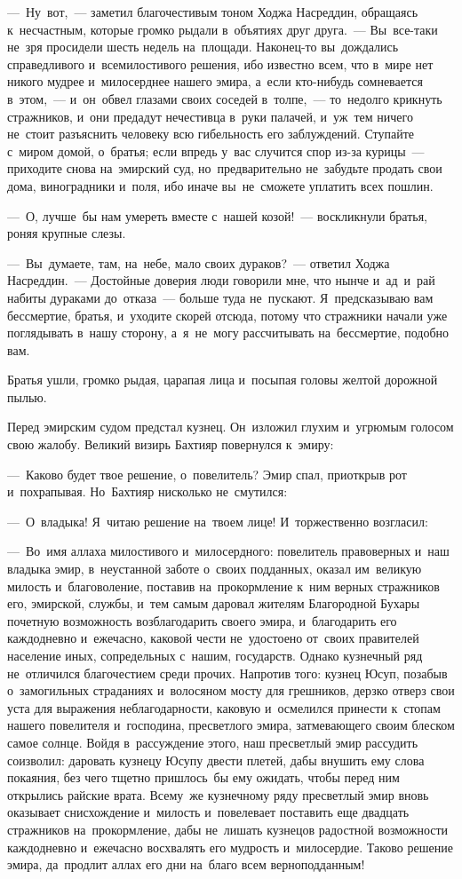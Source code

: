 \documentclass[12pt,a4paper]{book}
\begin{document}
—~Ну~вот,~— заметил благочестивым тоном Ходжа Насреддин, обращаясь к~несчастным, которые громко рыдали в~объятиях друг друга.~— Вы~все-таки не~зря просидели шесть недель на~площади. Наконец-то вы~дождались справедливого и~всемилостивого решения, ибо известно всем, что в~мире нет никого мудрее и~милосерднее нашего эмира, а~если кто-нибудь сомневается в~этом,~— и~он~обвел глазами своих соседей в~толпе,~— то~недолго крикнуть стражников, и~они предадут нечестивца в~руки палачей, и~уж~тем ничего не~стоит разъяснить человеку всю гибельность его заблуждений. Ступайте с~миром домой, о~братья; если впредь у~вас случится спор из-за курицы~— приходите снова на~эмирский суд, но~предварительно не~забудьте продать свои дома, виноградники и~поля, ибо иначе вы~не~сможете уплатить всех пошлин.

—~О, лучше~бы нам умереть вместе с~нашей козой!~— воскликнули братья, роняя крупные слезы.

—~Вы~думаете, там, на~небе, мало своих дураков?~— ответил Ходжа Насреддин.~— Достойные доверия люди говорили мне, что нынче и~ад~и~рай набиты дураками до~отказа~— больше туда не~пускают. Я~предсказываю вам бессмертие, братья, и~уходите скорей отсюда, потому что стражники начали уже поглядывать в~нашу сторону, а~я~не~могу рассчитывать на~бессмертие, подобно вам.

Братья ушли, громко рыдая, царапая лица и~посыпая головы желтой дорожной пылью.

Перед эмирским судом предстал кузнец. Он~изложил глухим и~угрюмым голосом свою жалобу. Великий визирь Бахтияр повернулся к~эмиру:

—~Каково будет твое решение, о~повелитель? Эмир спал, приоткрыв рот и~похрапывая. Но~Бахтияр нисколько не~смутился:

—~О~владыка! Я~читаю решение на~твоем лице! И~торжественно возгласил:

—~Во~имя аллаха милостивого и~милосердного: повелитель правоверных и~наш владыка эмир, в~неустанной заботе о~своих подданных, оказал им~великую милость и~благоволение, поставив на~прокормление к~ним верных стражников его, эмирской, службы, и~тем самым даровал жителям Благородной Бухары почетную возможность возблагодарить своего эмира, и~благодарить его каждодневно и~ежечасно, каковой чести не~удостоено от~своих правителей население иных, сопредельных с~нашим, государств. Однако кузнечный ряд не~отличился благочестием среди прочих. Напротив того: кузнец Юсуп, позабыв о~замогильных страданиях и~волосяном мосту для грешников, дерзко отверз свои уста для выражения неблагодарности, каковую и~осмелился принести к~стопам нашего повелителя и~господина, пресветлого эмира, затмевающего своим блеском самое солнце. Войдя в~рассуждение этого, наш пресветлый эмир рассудить соизволил: даровать кузнецу Юсупу двести плетей, дабы внушить ему слова покаяния, без чего тщетно пришлось~бы ему ожидать, чтобы перед ним открылись райские врата. Всему~же кузнечному ряду пресветлый эмир вновь оказывает снисхождение и~милость и~повелевает поставить еще двадцать стражников на~прокормление, дабы не~лишать кузнецов радостной возможности каждодневно и~ежечасно восхвалять его мудрость и~милосердие. Таково решение эмира, да~продлит аллах его дни на~благо всем верноподданным!
\end{document}
